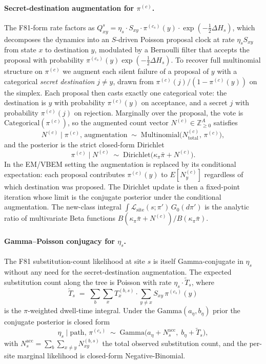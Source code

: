 \paragraph{Secret-destination augmentation for $\pi^{(c)}$.} The
F81-form rate factors as
$Q^s_{xy} = \eta_s \cdot S_{xy} \cdot \pi^{(c_s)}(y) \cdot \exp(-\tfrac{1}{2}\Delta H_s)$,
which decomposes the dynamics into an $S$-driven Poisson proposal
clock at rate $\eta_s S_{xy}$ from state $x$ to destination $y$,
modulated by a Bernoulli filter that accepts the proposal with
probability $\pi^{(c_s)}(y) \exp(-\tfrac{1}{2}\Delta H_s)$. To
recover full multinomial structure on $\pi^{(c)}$ we augment each
silent failure of a proposal of $y$ with a categorical \emph{secret
destination} $j \neq y$, drawn from $\pi^{(c)}(j)/(1 - \pi^{(c)}(y))$
on the simplex. Each proposal then casts exactly one categorical
vote: the destination is $y$ with probability $\pi^{(c)}(y)$ on
acceptance, and a secret $j$ with probability $\pi^{(c)}(j)$ on
rejection. Marginally over the proposal, the vote is
$\mathrm{Categorical}(\pi^{(c)})$, so the augmented count vector
$N^{(c)} \in \mathbb{Z}_{\geq 0}^A$ satisfies
\[
    N^{(c)} \mid \pi^{(c)},\, \text{augmentation} \;\sim\;
    \mathrm{Multinomial}\bigl(N^{(c)}_{\text{total}},\, \pi^{(c)}\bigr),
\]
and the posterior is the strict closed-form Dirichlet
\[
    \pi^{(c)} \mid N^{(c)} \;\sim\;
    \mathrm{Dirichlet}\bigl(\kappa_\pi \bar\pi + N^{(c)}\bigr).
\]
In the EM/VBEM setting the augmentation is replaced by its
conditional expectation: each proposal contributes $\pi^{(c)}(y)$ to
$E[N^{(c)}_y]$ regardless of which destination was proposed. The
Dirichlet update is then a fixed-point iteration whose limit is the
conjugate posterior under the conditional augmentation. The
new-class integral $\int \mathcal{L}_{\text{site}}(s; \pi')\, G_0(d\pi')$
is the analytic ratio of multivariate Beta functions
$B(\kappa_\pi \bar\pi + N^{(c)}) / B(\kappa_\pi \bar\pi)$.

\paragraph{Gamma--Poisson conjugacy for $\eta_s$.} The F81
substitution-count likelihood at site $s$ is itself Gamma-conjugate
in $\eta_s$ without any need for the secret-destination
augmentation. The expected substitution count along the tree is
Poisson with rate $\eta_s \cdot \tilde T_s$, where
\[
    \tilde T_s \;=\; \sum_b \sum_x T^{(b,s)}_x \cdot
    \sum_{y \neq x} S_{xy} \, \pi^{(c_s)}(y)
\]
is the $\pi$-weighted dwell-time integral. Under the
$\mathrm{Gamma}(a_\eta, b_\eta)$ prior the conjugate posterior is
closed form
\[
    \eta_s \mid \mathrm{path},\, \pi^{(c_s)} \;\sim\;
    \mathrm{Gamma}\!\bigl(a_\eta + N_s^{\mathrm{acc}},\; b_\eta + \tilde T_s\bigr),
\]
with $N_s^{\mathrm{acc}} = \sum_b \sum_{x \neq y} N^{(b,s)}_{xy}$
the total observed substitution count, and the per-site marginal
likelihood is closed-form Negative-Binomial.

